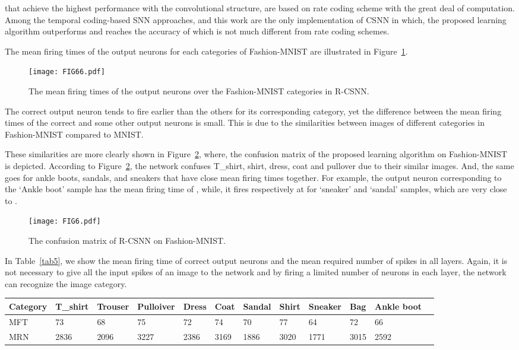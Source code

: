 \documentclass[preprint,twocolumn,5p,12pt]{article}
\begin{document}
\cite{R11, R13} that achieve the highest performance with the convolutional structure, are based on rate coding scheme with the great deal of computation.
Among the temporal coding-based SNN approaches, \cite{R18} and this work are the only implementation of CSNN in which, the proposed learning algorithm outperforms and reaches the accuracy of  which is not much different from rate coding schemes.

The mean firing times of the output neurons for each categories of Fashion-MNIST are illustrated in Figure~\ref{FIG66}.
\begin{figure}
\centering
\texttt{[image: FIG66.pdf]} 
\caption{The mean firing times of the output neurons over the Fashion-MNIST categories in R-CSNN.} \label{FIG66}
\end{figure}
The correct output neuron tends to fire earlier than the others for its corresponding category, yet the difference between the mean firing times of the correct and some other output neurons is small. This is due to the similarities between images of different categories in Fashion-MNIST compared to MNIST.

These similarities are more clearly shown in Figure~\ref{FIG6}, where, the confusion matrix of the proposed learning algorithm on Fashion-MNIST is depicted.
According to Figure~\ref{FIG6}, the network confuses T\_shirt, shirt, dress, coat and pullover due to their similar images. And, the same goes for ankle boots, sandals, and sneakers that have close mean firing times together. 
For example, the output neuron corresponding to the `Ankle boot' sample has the mean firing time of , while, it fires respectively at  for `sneaker' and `sandal' samples, which are very close to .
\begin{figure}[ht]
\centering
\texttt{[image: FIG6.pdf]} 
\caption{The confusion matrix of R-CSNN on Fashion-MNIST.} \label{FIG6}
\end{figure}

In Table~\ref{tab5}, we show the mean firing time of correct output neurons and the mean required number of spikes in all layers. 
Again, it is not necessary to give all the input spikes of an image to the network and by firing a limited number of neurons in each layer, the network can recognize the image category.

\begin{table*}
\begin{center}
\caption{The mean firing time (MFT) of the correct output neuron and the mean required number (MRN) of spikes in all the layers for each category of Fashion-MNIST in R-CSNN.} \label{tab5}
\begin{tabular}{lllllllllllc}
\scriptsize
Category & T\_shirt & Trouser &  Pulloiver & Dress & Coat & Sandal & Shirt & Sneaker & Bag & Ankle boot \\
\hline
MFT & 73 & 68 & 75 & 72 & 74 & 70 & 77 & 64 & 72 & 66 \\
MRN & 2836 & 2096 & 3227 & 2386 & 3169 & 1886 & 3020 & 1771 & 3015 & 2592
\end{tabular}
\end{center}
\end{table*}
\end{document}
